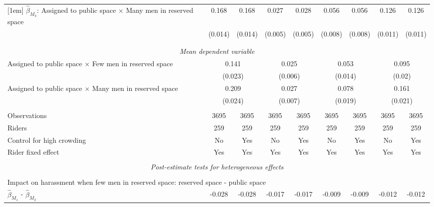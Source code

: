 \begin{tabular}{l*{8}{c}}
[1em]
$\hat\beta_{M_4}$: Assigned to public space $\times$ Many men in reserved space&       0.168\sym{***}&       0.168\sym{***}&       0.027\sym{***}&       0.028\sym{***}&       0.056\sym{***}&       0.056\sym{***}&       0.126\sym{***}&       0.126\sym{***}\\
                    &     (0.014)         &     (0.014)         &     (0.005)         &     (0.005)         &     (0.008)         &     (0.008)         &     (0.011)         &     (0.011)         \\
\\[-1.8ex] \hline \\[-1.8ex] \multicolumn{9}{c}{\textit{Mean dependent variable}} \\ Assigned to public space $\times$ Few men in reserved space& \multicolumn{2}{c}{0.141} & \multicolumn{2}{c}{0.025} & \multicolumn{2}{c}{0.053} & \multicolumn{2}{c}{0.095} \\  & \multicolumn{2}{c}{(0.023)} & \multicolumn{2}{c}{(0.006)} & \multicolumn{2}{c}{(0.014)} & \multicolumn{2}{c}{(0.02)} \\ Assigned to public space $\times$ Many men in reserved space & \multicolumn{2}{c}{0.209} & \multicolumn{2}{c}{0.027} & \multicolumn{2}{c}{0.078} & \multicolumn{2}{c}{0.161} \\  & \multicolumn{2}{c}{(0.024)} & \multicolumn{2}{c}{(0.007)} & \multicolumn{2}{c}{(0.019)} & \multicolumn{2}{c}{(0.021)} \\\\[-1ex] 
Observations        &        3695         &        3695         &        3695         &        3695         &        3695         &        3695         &        3695         &        3695         \\
Riders              &         259         &         259         &         259         &         259         &         259         &         259         &         259         &         259         \\
Control for high crowding&          No         &         Yes         &          No         &         Yes         &          No         &         Yes         &          No         &         Yes         \\
Rider fixed effect  &         Yes         &         Yes         &         Yes         &         Yes         &         Yes         &         Yes         &         Yes         &         Yes         \\
\hline \\[-1ex]  \multicolumn{9}{c}{\textit{Post-estimate tests for heterogeneous effects}} \\\\[-1ex] \multicolumn{9}{l}{Impact on harassment when few men in reserved space: reserved space - public space} \\ \quad $\hat\beta_{M_1}$ - $\hat\beta_{M_2}$&      -0.028         &      -0.028         &      -0.017         &      -0.017         &      -0.009         &      -0.009         &      -0.012         &      -0.012         \\

\end{tabular}

